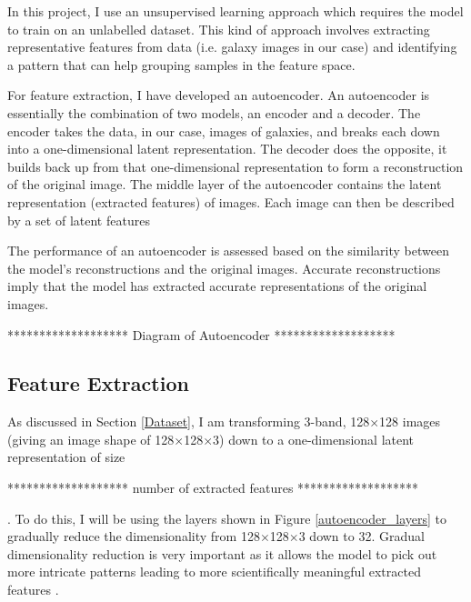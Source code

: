\documentclass[12pt, onecolumn]{article}
\begin{document}
    In this project, I use an unsupervised learning approach which requires the model to train on an unlabelled dataset. This kind of approach involves extracting representative features from data (i.e. galaxy images in our case) and identifying a pattern that can help grouping samples in the feature space.

    For feature extraction, I have developed an autoencoder. An autoencoder is essentially the combination of two models, an encoder and a decoder. The encoder takes the data, in our case, images of galaxies, and breaks each down into a one-dimensional latent representation. The decoder does the opposite, it builds back up from that one-dimensional representation to form a reconstruction of the original image. The middle layer of the autoencoder contains the latent representation (extracted features) of images. Each image can then be described by a set of latent features

    The performance of an autoencoder is assessed based on the similarity between the model's reconstructions and the original images. Accurate reconstructions imply that the model has extracted accurate representations of the original images.



    \vspace{10mm}
    *******************
    Diagram of Autoencoder
    *******************
    \vspace{10mm}


    
    
    
    \subsection{Feature Extraction}
    \label{Feature Extraction}

        As discussed in Section \ref{Dataset}, I am transforming 3-band, 128$\times$128 images (giving an image shape of 128$\times$128$\times$3) down to a one-dimensional latent representation of size 
        
        \vspace{5mm}
        *******************
        number of extracted features 
        *******************
        \vspace{5mm}
        
        . To do this, I will be using the layers shown in Figure \ref{autoencoder_layers} to gradually reduce the dimensionality from 128$\times$128$\times$3 down to 32. Gradual dimensionality reduction is very important as it allows the model to pick out more intricate patterns leading to more scientifically meaningful extracted features \cite{dnn_feature_extraction}.
\end{document}
